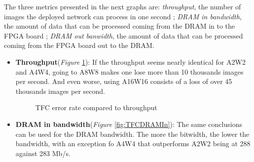 The three metrics presented in the next graphs are: \emph{throughput}, the number of images the deployed network can process in one second ; \emph{DRAM in bandwidth}, the amount of data that can be processed coming from the DRAM in to the FPGA board ; \emph{DRAM out banwidth}, the amount of data that can be processed coming from the FPGA board out to the DRAM.

\begin{itemize}
  \item \textbf{Throughput}(\emph{Figure} \ref{fig:TFCThroughput}): If the throughput seems nearly identical for A2W2 and A4W4, going to A8W8 makes one lose more than 10 thousands images per second. And even worse, using A16W16 consists of a loss of over 45 thousands images per second.

  \begin{figure}[htbp]
  \centering
  \caption[TFC Throughput]{TFC error rate compared to throughput}
    \label{fig:TFCThroughput}
  \end{figure}


  \item \textbf{DRAM in bandwidth}(\emph{Figure} \ref{fig:TFCDRAMIn}): The same conclusions can be used for the DRAM bandwidth. The more the bitwidth, the lower the bandwidth, with an exception fo A4W4 that outperforms A2W2 being at 288 against 283 Mb/s.


\end{itemize}
